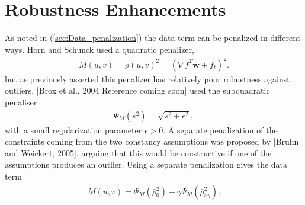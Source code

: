 \section{Robustness Enhancements}
As noted in (\ref{sec:Data_penalization}) the data term can be penalized in different ways. Horn and Schunck \cite{HS} used a quadratic penalizer,
\begin{align}
M(u,v) = \rho(u,v) ^2 = (\nabla f ^T \textbf{w}+ f_t)^2.
\end{align}
but as previously asserted this penalizer has relatively poor robustness against outliers. [Brox et al., 2004 Reference coming soon] used the subquadratic penaliser
\begin{align*}
\Psi_M(s^2) = \sqrt{s^2 + \epsilon^2},
\end{align*} 
with a small regularization parameter $\epsilon > 0$. A separate penalization of the constraints coming from the two constancy assumptions was proposed by [Bruhn and Weickert, 2005], arguing that this would be constructive if one of the assumptions produces an outlier. Using a separate penalization gives the data term
\begin{align}
\label{sep_pen}
M(u,v) = \Psi_M(\bar{\rho}_0^2) + \gamma \Psi_M(\bar{\rho}_{xy}^2).
\end{align}